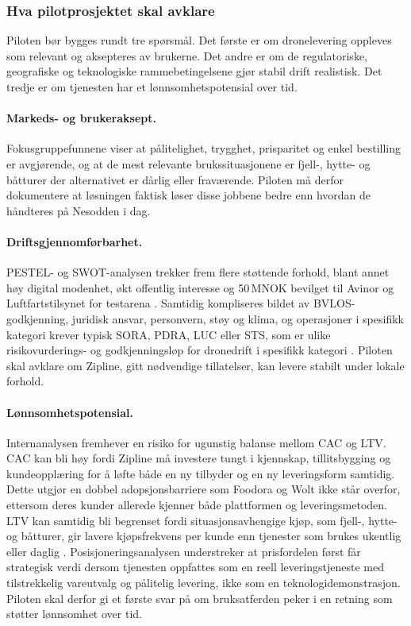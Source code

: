 \subsubsection{Hva pilotprosjektet skal avklare}

Piloten bør bygges rundt tre spørsmål. Det første er om dronelevering
oppleves som relevant og aksepteres av brukerne. Det andre er om de
regulatoriske, geografiske og teknologiske rammebetingelsene gjør stabil
drift realistisk. Det tredje er om tjenesten har et lønnsomhetspotensial
over tid.

\paragraph{Markeds- og brukeraksept.}
Fokusgruppefunnene viser at pålitelighet, trygghet, prisparitet og enkel
bestilling er avgjørende, og at de mest relevante brukssituasjonene er
fjell-, hytte- og båtturer der alternativet er dårlig eller fraværende.
Piloten må derfor dokumentere at løsningen faktisk løser disse jobbene bedre
enn hvordan de håndteres på Nesodden i dag.

\paragraph{Driftsgjennomførbarhet.}
PESTEL- og SWOT-analysen trekker frem flere støttende forhold, blant annet
høy digital modenhet, økt offentlig interesse og 50\,MNOK bevilget til
Avinor og Luftfartstilsynet for testarena
\parencite{stortingsmelding2025, prop1s2024}. Samtidig kompliseres bildet
av BVLOS-godkjenning, juridisk ansvar, personvern, støy og klima, og
operasjoner i spesifikk kategori krever typisk SORA, PDRA, LUC eller STS,
som er ulike risikovurderings- og godkjenningsløp for dronedrift i
spesifikk kategori \parencite{luftfartstilsynet2026}. Piloten skal avklare
om Zipline, gitt nødvendige tillatelser, kan levere stabilt under lokale
forhold.

\paragraph{Lønnsomhetspotensial.}
Internanalysen fremhever en risiko for ugunstig balanse mellom CAC og LTV.
CAC kan bli høy fordi Zipline må investere tungt i kjennskap,
tillitsbygging og kundeopplæring for å løfte både en ny tilbyder og en ny
leveringsform samtidig. Dette utgjør en dobbel adopsjonsbarriere som
Foodora og Wolt ikke står overfor, ettersom deres kunder allerede kjenner
både plattformen og leveringsmetoden. LTV kan samtidig bli begrenset fordi
situasjonsavhengige kjøp, som fjell-, hytte- og båtturer, gir lavere
kjøpsfrekvens per kunde enn tjenester som brukes ukentlig eller daglig
\parencite[11]{pfeifer2005}. Posisjoneringsanalysen understreker at
prisfordelen først får strategisk verdi dersom tjenesten oppfattes som en
reell leveringstjeneste med tilstrekkelig vareutvalg og pålitelig levering,
ikke som en teknologidemonstrasjon. Piloten skal derfor gi et første svar på
om bruksatferden peker i en retning som støtter lønnsomhet over tid.

